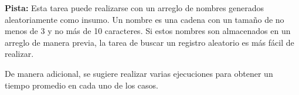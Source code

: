 \documentclass[12pt]{article}
\begin{document}
\textbf{Pista:} Esta tarea puede realizarse con un arreglo de nombres generados aleatoriamente como insumo. Un nombre es una cadena con un tamaño de no menos de 3 y no más de 10 caracteres. Si estos nombres son almacenados en un arreglo de manera previa, la tarea de buscar un registro aleatorio es más fácil de realizar.

De manera adicional, se sugiere realizar varias ejecuciones para obtener un tiempo promedio en cada uno de los casos.
\end{document}

